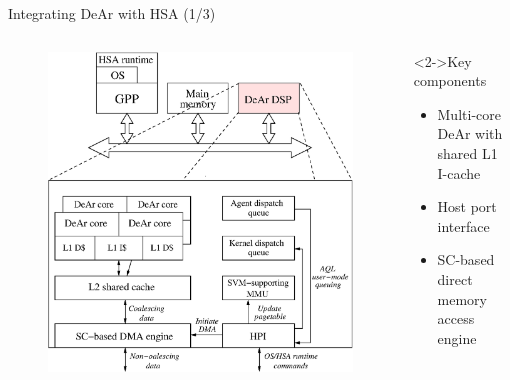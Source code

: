 \documentclass{beamer}
\begin{document}
\begin{CJK}{UTF8}{bkai}
            \begin{frame}{Integrating DeAr with HSA (1/3)}
                \begin{columns}
                    \begin{column}{0.6\textwidth}
                        \begin{figure}[!ht] 
                            \centering
                            \includegraphics[width=1.0\textwidth]{./figs/archi.eps}
                            \label{fig:archi}
                        \end{figure}
                    \end{column}
                    \begin{column}{0.40\textwidth}
                        \begin{block}<2->{Key components}
                            \begin{itemize}
                                \item <3->{Multi-core DeAr with shared L1 I-cache}
                                \item <4->{Host port interface}
                                \item <5->{SC-based direct memory access engine}
                            \end{itemize}
                        \end{block}
                    \end{column}
                \end{columns}
            \end{frame}


\end{CJK}
\end{document}
